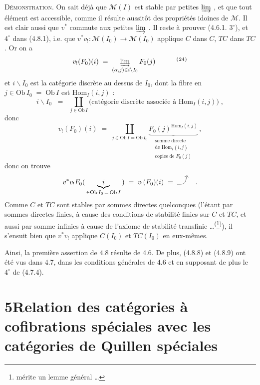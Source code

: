 \documentclass[11pt]{article}
\newcommand{\printedpage}[1]{\marginpar{\footnotesize p.~#1}}
\newcommand{\msp}[1]{\marginpar{\footnotesize [#1]}}
\newcommand{\fnm}[1]{\textsuperscript{(}\footnotemark[#1]\textsuperscript{)}}
\begin{document}
\textsc{Démonstration}. On sait déjà que $\mathcal{M}(I)$ est stable par petites $\varinjlim$ , et que tout élément est accessible, comme il résulte aussitôt des propriétés idoines de $\mathcal{M}$. Il est clair aussi que $v^{*}$ commute aux petites $\varinjlim$ . Il reste à prouver (4.6.1. $3^{\circ}$), et $4^{\circ}$ dans (4.8.1), i.e. \msp{page 83} que $v^{*}v_{!} : \mathcal{M}(I_0) \longrightarrow \mathcal{M}(I_0)$ applique $C$ dans $C$, $TC$ dans $TC$. Or on a
\[
v_{!}(F_0)(i) \;=\; \varinjlim_{(\alpha,j)\in i\backslash I_0} F_0(j) \qquad\quad \text{\fnm{24}}
\]
et $i\backslash I_0$ est la catégorie discrète au dessus de $I_0$, dont la fibre en $j \in \mathrm{Ob}\, I_0 \;=\; \mathrm{Ob}\, I$ est $\mathrm{Hom}_I(i,j)$ :
\[
i\backslash I_0 \;\;=\;\; \coprod_{j\in \mathrm{Ob}\, I} \text{(catégorie discrète associée à $\mathrm{Hom}_I(i,j)$)} \; ,
\]
\printedpage{41}
donc
\[
v_{!}(F_0)(i) \;=\; \coprod_{j\in \mathrm{Ob}\, I = \mathrm{Ob}\, I_0} \underbrace{F_0(j)^{\mathrm{Hom}_I(i,j)}}_{\substack{\text{somme directe}\\ \text{de } \mathrm{Hom}_I(i,j)\\ \text{copies de } F_0(j)}} \, ,
\]
donc on trouve
\[
v^{*}v_{!}F_0( \, \underbrace{\; i \;}_{\in \mathrm{Ob}\, I_0 \,=\, \mathrm{Ob}\, I} \, ) \;=\; v_{!}(F_0)(i) \;=\; \text{\tikz[baseline=0pt]\draw[->] (0,0) .. controls (0.4,0) .. (0.5,0.45);} \quad .
\]
Comme $C$ et $TC$ sont stables par sommes directes quelconques (l'étant par sommes directes finies, à cause des conditions de stabilité finies sur $C$ et $TC$, et aussi par somme infinies à cause de l'axiome de stabilité transfinie \dots\textsuperscript{(}\footnote[25]{mérite un lemme général \dots}\textsuperscript{)}), il s'ensuit bien que $v^{*}v_{!}$ applique $C(I_0)$ et $TC(I_0)$ en eux-mêmes. %

Ainsi, la première assertion de 4.8 résulte de 4.6. De plus, (4.8.8) et (4.8.9) ont été vus dans 4.7, dans les conditions générales de 4.6 et en supposant de plus le $4^{\circ}$ de (4.7.4).

\msp{page 84}

\section*{5\quad Relation des catégories à cofibrations spéciales avec les catégories de Quillen spéciales}
\end{document}
